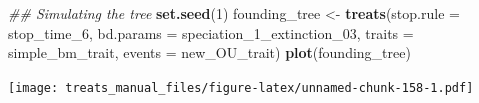 \documentclass[
]{book}
\newenvironment{Shaded}{\begin{snugshade}}{\end{snugshade}}
\newcommand{\CommentTok}[1]{\textcolor[rgb]{0.56,0.35,0.01}{\textit{#1}}}
\newcommand{\DataTypeTok}[1]{\textcolor[rgb]{0.13,0.29,0.53}{#1}}
\newcommand{\DecValTok}[1]{\textcolor[rgb]{0.00,0.00,0.81}{#1}}
\newcommand{\KeywordTok}[1]{\textcolor[rgb]{0.13,0.29,0.53}{\textbf{#1}}}
\newcommand{\NormalTok}[1]{#1}
\newcommand{\StringTok}[1]{\textcolor[rgb]{0.31,0.60,0.02}{#1}}
\begin{document}
\begin{Shaded}
\begin{Highlighting}[]
\CommentTok{\#\# Simulating the tree}
\KeywordTok{set.seed}\NormalTok{(}\DecValTok{1}\NormalTok{)}
\NormalTok{founding\_tree \textless{}{-}}\StringTok{ }\KeywordTok{treats}\NormalTok{(}\DataTypeTok{stop.rule =}\NormalTok{ stop\_time\_}\DecValTok{6}\NormalTok{,}
                      \DataTypeTok{bd.params =}\NormalTok{ speciation\_}\DecValTok{1}\NormalTok{\_extinction\_}\DecValTok{03}\NormalTok{,}
                      \DataTypeTok{traits =}\NormalTok{ simple\_bm\_trait,}
                      \DataTypeTok{events =}\NormalTok{ new\_OU\_trait)}
\KeywordTok{plot}\NormalTok{(founding\_tree)}
\end{Highlighting}
\end{Shaded}

\texttt{[image: treats\_manual\_files/figure-latex/unnamed-chunk-158-1.pdf]}

  
\end{document}
